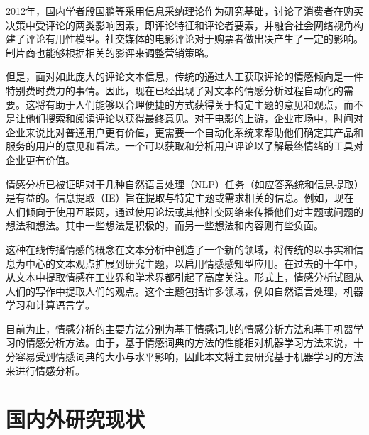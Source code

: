 \documentclass[a4paper,AutoFakeBold,oneside,12pt]{book}
\begin{document}
2012年，国内学者殷国鹏等采用信息采纳理论作为研究基础，讨论了消费者在购买决策中受评论的两类影响因素，即评论特征和评论者要素，并融合社会网络视角构建了评论有用性模型\cite{yinguopengWangLuoSheQuZaiXianPingLunYouYongXingYingXiangMoXingYanJiuJiYuXinXiCaiNaYuSheHuiWangLuoShiJiao2012}。社交媒体的电影评论对于购票者做出决产生了一定的影响。制片商也能够根据相关的影评来调整营销策略。

但是，面对如此庞大的评论文本信息，传统的通过人工获取评论的情感倾向是一件特别费时费力的事情。因此，现在已经出现了对文本的情感分析过程自动化的需要。这将有助于人们能够以合理便捷的方式获得关于特定主题的意见和观点，而不是让他们搜索和阅读评论以获得最终意见。对于电影的上游，企业市场中，时间对企业来说比对普通用户更有价值，更需要一个自动化系统来帮助他们确定其产品和服务的用户的意见和看法。一个可以获取和分析用户评论以了解最终情绪的工具对企业更有价值。

情感分析已被证明对于几种自然语言处理（NLP）任务（如应答系统和信息提取）是有益的\cite{pangOpinionMiningSentiment2008}。信息提取（IE）旨在提取与特定主题或需求相关的信息。例如，现在人们倾向于使用互联网，通过使用论坛或其他社交网络来传播他们对主题或问题的想法和想法。其中一些想法是积极的，而另一些想法和内容则有些负面。

这种在线传播情感的概念在文本分析中创造了一个新的领域，将传统的以事实和信息为中心的文本观点扩展到研究主题，以启用情感感知型应用。在过去的十年中，从文本中提取情感在工业界和学术界都引起了高度关注。形式上，情感分析试图从人们的写作中提取人们的观点。这个主题包括许多领域，例如自然语言处理，机器学习和计算语言学。

目前为止，情感分析的主要方法分别为基于情感词典的情感分析方法和基于机器学习的情感分析方法。由于，基于情感词典的方法的性能相对机器学习方法来说，十分容易受到情感词典的大小与水平影响，因此本文将主要研究基于机器学习的方法来进行情感分析。

\section{国内外研究现状}
\end{document}
